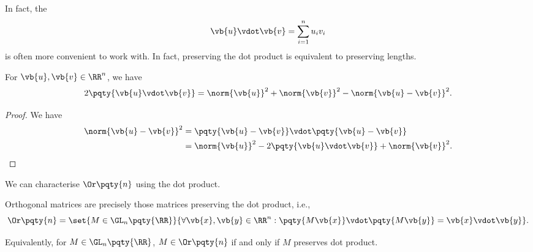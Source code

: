 In fact, the 
\[
    \vb{u} \vdot \vb{v} = \sum_{i = 1}^{n} u_i v_i
\]
is often more convenient to work with. In fact, preserving the dot product is equivalent to preserving lengths.

\begin{lemma}
    \label{lem:polarisation-identity}%
    For \(\vb{u}, \vb{v} \in \RR^n\), we have
    \[
        2 \pqty{\vb{u} \vdot \vb{v}} = \norm{\vb{u}}^2 + \norm{\vb{v}}^2 - \norm{\vb{u} - \vb{v}}^2.
    \]
\end{lemma}

\begin{proof}
    We have
    \begin{align*}
        \norm{\vb{u} - \vb{v}}^2 &= \pqty{\vb{u} - \vb{v}} \vdot \pqty{\vb{u} - \vb{v}} \\
        &= \norm{\vb{u}}^2 - 2 \pqty{\vb{u} \vdot \vb{v}} + \norm{\vb{v}}^2.
    \end{align*}
\end{proof}

We can characterise \(\Or\pqty{n}\) using the dot product.

\begin{lemma}
    \label{lem:orthogonal-dot-product}%
    Orthogonal matrices are precisely those matrices preserving the dot product, i.e.,
    \[
        \Or\pqty{n} = \set{M \in \GL_n\pqty{\RR}}{\forall \vb{x}, \vb{y} \in \RR^n: \pqty{M\vb{x}} \vdot \pqty{M\vb{y}} = \vb{x} \vdot \vb{y}}.
    \]

    Equivalently, for \(M \in \GL_{n} \pqty{\RR}\), \(M \in \Or\pqty{n}\) if and only if \(M\) preserves dot product.
\end{lemma}

